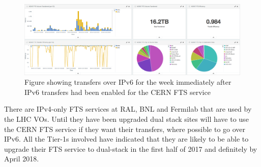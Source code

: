 \documentclass[a4paper]{jpconf}
\begin{document}
\begin{figure}[htbp]
\begin{center}
\includegraphics[width=\textwidth]{FTSIPv6Monitoring}
\caption{Figure showing transfers over IPv6 for the week immediately after IPv6 transfers had been enabled for the CERN FTS service}
\label{Fig:FTSMonitor}
\end{center}
\end{figure}

There are IPv4-only FTS services at RAL, BNL and Fermilab that are used by the LHC VOs.  Until they have been upgraded dual stack sites will have to use the CERN FTS service  if they want their transfers, where possible to go over IPv6.  All the Tier-1s involved have indicated that they are likely to be able to upgrade their FTS service to dual-stack in the first half of 2017 and definitely by April 2018.



\end{document}
